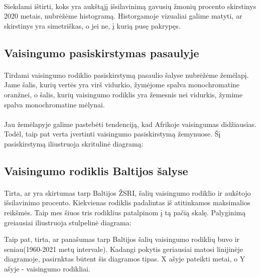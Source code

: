 \paragraph{} Siekdami ištirti, koks yra aukštąjį išsilavinimą gavusių žmonių procento skirstinys 2020 metais, nubrėžėme histogramą. Historgamoje vizualiai galime matyti, ar skirstinys yra simetriškas, o jei ne, į kurią pusę pakrypęs.
\pagebreak

\subsection{Vaisingumo pasiskirstymas pasaulyje}
\paragraph{} Tirdami vaisingumo rodiklio pasiskirstymą pasaulio šalyse nubrėžėme žemėlapį. Jame šalis, kurių vertės yra virš vidurkio, žymėjome spalva monochromatine oranžnei, o šalis, kurių vaisingumo rodiklis yra žemesnis nei vidurkis, žymime spalva monochromatine mėlynai.

\paragraph{} Jau žemėlapyje galime pastebėti tendenciją, kad Afrikoje vaisingumas didžiausias. Todėl, taip pat verta įvertinti vaisingumo pasiskirstymą žemynuose. Šį pasiskirstymą iliustruoja skritulinė diagramą:
\pagebreak

\subsection{Vaisingumo rodiklis Baltijos šalyse}
\paragraph{} Tirta, ar yra skirtumas tarp Baltijos ŽSRI, šalių vaisingumo rodiklio ir aukštojo išsilavinimo procento. Kiekvienas rodiklis padalintas iš atitinkamos maksimalios reikšmės. Taip mes šiuos tris rodiklius patalpinom į tą pačią skalę. Palyginimą greiausiai iliustruoja stulpelinė diagrama:

Taip pat, tirta, ar panašumas tarp Baltijos šalių vaisingumo rodiklių buvo ir seniau(1960-2021 metų intervale). Kadangi pokytis geriausiai matosi linijinėje diagramoje, pasirnktas būtent šis diagramos tipas. X ašyje pateikti metai, o Y ašyje - vaisingumo rodikliai.
\pagebreak

